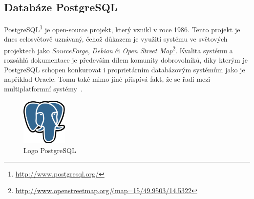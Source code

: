 \documentclass[a4paper,12pt,oneside]{report}
\begin{document}
\subsection{Databáze PostgreSQL}
PostgreSQL\footnote{\url{http://www.postgresql.org/}} je open-source
projekt, který vznikl v roce 1986. Tento projekt je dnes celosvětově
uznávaný, čehož důkazem je využití systému ve světových projektech
jako \textit{SourceForge}, %
\textit{Debian} či %
\textit{Open
  Street
  Map}\footnote{\url{http://www.openstreetmap.org\#map=15/49.9503/14.5322}}. Kvalita
systému a rozsáhlá dokumentace je především dílem komunity
dobrovolníků, díky kterým je PostgreSQL schopen konkurovat i
proprietárním databázovým systémům jako je například Oracle. Tomu také mimo jiné přispívá fakt,
že se řadí mezi multiplatformní systémy~\cite{postgre}.

\begin{figure}[h!]
    \centering
    \includegraphics[width=0.2\textwidth]{./img/implementace/postgresql.png}
    \caption[Logo PostgreSQL]{\centering Logo PostgreSQL }
 \end{figure}   
\end{document}
